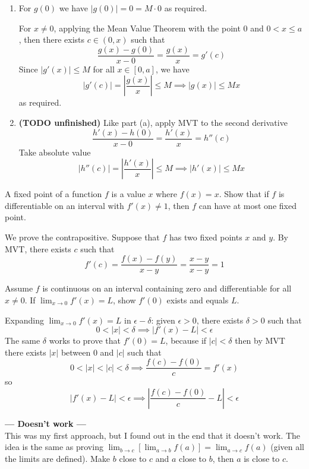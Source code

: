 \documentclass{oxmathproblems}
\begin{document}
\begin{questions}
\begin{solution}
  \begin{enumerate}[label=(\alph*)]
    \item For $g(0)$ we have $|g(0)|=0=M\cdot0$ as required.
    
    For $x \neq 0$, applying the Mean Value Theorem with the point 0 and $0 < x \leq a$, then there exists $c \in (0, x)$ such that
    \[\frac{g(x)-g(0)}{x-0}=\frac{g(x)}{x} = g'(c)\]
    Since $|g'(x)| \leq M$ for all $x \in [0, a]$, we have
    \[|g'(c)|=\left|\frac{g(x)}{x}\right| \leq M \implies |g(x)| \leq Mx\]
    as required.

    \item \textbf{(TODO unfinished)} Like part (a), apply MVT to the second derivative 
    \[\frac{h'(x)-h(0)}{x-0}=\frac{h'(x)}{x}=h''(c)\]
    Take absolute value
    \[|h''(c)|=\left|\frac{h'(x)}{x}\right| \leq M \implies |h'(x)| \leq Mx\]

  \end{enumerate}
\end{solution}

\miquestion A fixed point of a function $f$ is a value $x$ where $f(x)=x$. Show that if $f$ is differentiable on an interval with $f'(x) \neq 1$, then $f$ can have at most one fixed point.
\begin{solution}
  We prove the contrapositive. Suppose that $f$ has two fixed points $x$ and $y$. By MVT, there exists $c$ such that
  \[f'(c) = \frac{f(x)-f(y)}{x-y}=\frac{x-y}{x-y}=1\]
\end{solution}

\miquestion Assume $f$ is continuous on an interval containing zero and differentiable for all $x \neq 0$. If $\lim_{x \to 0}f'(x)=L$, show $f'(0)$ exists and equals $L$.
\begin{solution}
  Expanding $\lim_{x \to 0}f'(x) = L$ in $\epsilon-\delta$: given $\epsilon > 0$, there exists $\delta > 0$ such that
  \[0 < |x| < \delta \implies |f'(x)-L| < \epsilon\]
  The same $\delta$ works to prove that $f'(0)=L$, because if $|c| < \delta$ then by MVT there exists $|x|$ between 0 and $|c|$ such that
  \[0 < |x| < |c| < \delta \implies \frac{f(c)-f(0)}{c} = f'(x) \]
  so
  \[|f'(x)-L| < \epsilon \implies \left|\frac{f(c)-f(0)}{c}-L\right| < \epsilon\]

  \textbf{--- Doesn't work ---}\\
  This was my first approach, but I found out in the end that it doesn't work. The idea is the same as proving $\lim_{b \to c}[\lim_{a \to b}f(a)]=\lim_{a \to c}f(a)$ (given all
  the limits are defined). Make $b$ close to $c$ and $a$ close to $b$, then $a$ is close to $c$.


\end{solution}
\end{questions}
\end{document}
